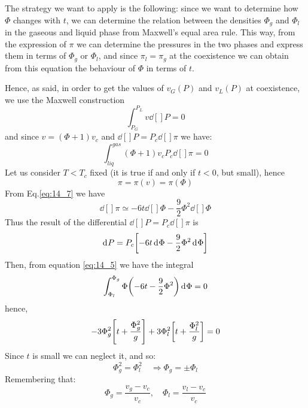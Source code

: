 \documentclass[../main/main.tex]{subfiles}
\begin{document}
The strategy we want to apply is the following: since we want to determine how \( \Phi  \)  changes with \( t \), we can determine the relation between the densities \( \Phi_g \) and \( \Phi _l \) in the gaseous and liquid phase from Maxwell's equal area rule. This way, from the expression of \( \pi \) we can determine the pressures in the two phases and express them in terms of \( \Phi_g \)  or \( \Phi _l \), and since \( \pi_l = \pi _g \) at the coexistence we can obtain from this equation the behaviour of \( \Phi  \)  in terms of \( t \).

Hence, as said, in order to get the values of \( v_G (P) \) and \( v_L (P) \) at coexistence, we use the Maxwell construction
\begin{equation*}
  \int_{P_G}^{P_L} v\dd[]{P} = 0
\end{equation*}
and since \( v =  (\Phi +1)v_c \) and \(   \dd[]{P} = P_c \dd[]{\pi }  \) we have:
\begin{equation}
  \int_{liq}^{gas} (\Phi +1) v_c P_c \dd[]{\pi } = 0
    \label{eq:14_5}
\end{equation}
Let us consider \( T < T_c \) fixed (it is true if and only if \( t<0 \), but small), hence
\begin{equation*}
  \pi = \pi (v) = \pi (\Phi )
\end{equation*}
From Eq.\eqref{eq:14_7} we have
\begin{equation*}
  \dd[]{\pi} \simeq - 6 t \dd[]{\Phi } - \frac{9}{2} \Phi ^2 \dd[]{\Phi }
\end{equation*}
Thus the result of the differential \(   \dd[]{P} = P_c \dd[]{\pi }  \) is
\begin{equation*}
   \dd[]{P} = P_c \qty[-6t \dd[]{\Phi } - \frac{9}{2} \Phi ^2 \dd[]{\Phi }  ]
\end{equation*}
Then, from equation \eqref{eq:14_5} we have the integral
\begin{equation}
  \int_{\Phi _l}^{\Phi _g} \Phi \qty(-6t - \frac{9}{2} \Phi ^2) \dd[]{\Phi }  = 0
\end{equation}
hence,
\begin{equation*}
   - 3 \Phi _g^2 \qty[t + \frac{\Phi_g ^2}{g}] + 3 \Phi _l^2 \qty[t + \frac{\Phi _l^2}{g}] = 0
\end{equation*}
Since \( t \) is small we can neglect it, and so:
\begin{equation*}
  \Phi _g^2 = \Phi _l^2 \quad \Rightarrow   \Phi _g = \pm \Phi _l
\end{equation*}
Remembering that:
\begin{equation*}
  \Phi _g = \frac{v_g - v_c}{v_c}, \quad \Phi _l = \frac{v_l - v_c}{v_c}
\end{equation*}
\end{document}
